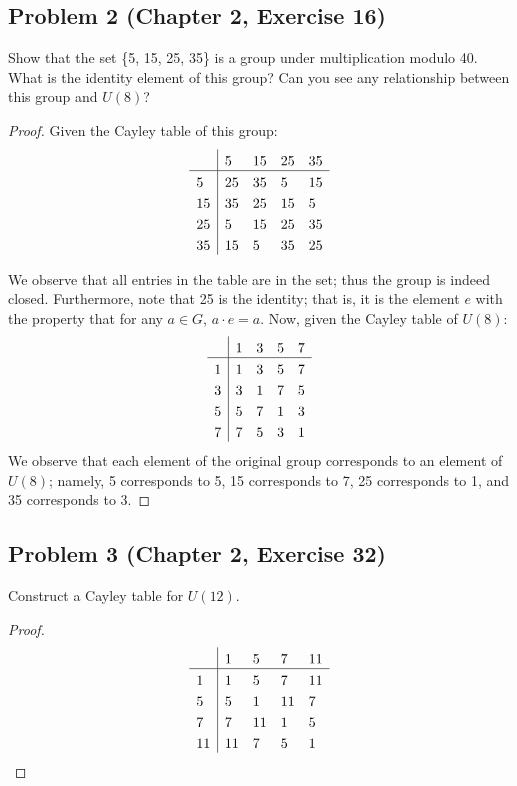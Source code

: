 \documentclass{article}
\begin{document}
\subsection*{Problem 2 (Chapter 2, Exercise 16)}
Show that the set \{5, 15, 25, 35\} is a group under multiplication modulo 40. What is the identity element of this group? Can you see any relationship between this group and $U(8)$?
\begin{proof}
Given the Cayley table of this group:
\[
    \setlength{\extrarowheight}{3pt}
    \begin{array}{l|*{4}{l}}
        & 5   & 15   & 25  & 35  \\
    \hline
    5   & 25   & 35   & 5  & 15  \\
    15   & 35   & 25   & 15 & 5  \\
    25   & 5   & 15  & 25  & 35  \\
    35  & 15  & 5   & 35  & 25  \\
    \end{array} 
\]

We observe that all entries in the table are in the set; thus the group is indeed closed. Furthermore, note that 25 is the identity; that is, it is the element $e$ with the property that for any $a \in G$, $a \cdot e = a$. Now, given the Cayley table of $U(8)$:
\[
    \setlength{\extrarowheight}{3pt}
    \begin{array}{l|*{4}{l}}
        & 1   & 3   & 5  & 7  \\
    \hline
    1   & 1   & 3   & 5  & 7  \\
    3   & 3   & 1   & 7 & 5  \\
    5   & 5   & 7  & 1  & 3  \\
    7  & 7  & 5   & 3  & 1  \\
    \end{array} 
\]
We observe that each element of the original group corresponds to an element of $U(8)$; namely, 5 corresponds to 5, 15 corresponds to 7, 25 corresponds to 1, and 35 corresponds to 3.

\end{proof}

\subsection*{Problem 3 (Chapter 2, Exercise 32)}
Construct a Cayley table for $U(12)$.
\begin{proof}
\[
    \setlength{\extrarowheight}{3pt}
    \begin{array}{l|*{4}{l}}
        & 1   & 5   & 7  & 11  \\
    \hline
    1   & 1   & 5   & 7  & 11  \\
    5   & 5   & 1   & 11 & 7  \\
    7   & 7   & 11  & 1  & 5  \\
    11  & 11  & 7   & 5  & 1  \\
    \end{array} 
\]
\end{proof}
\end{document}
